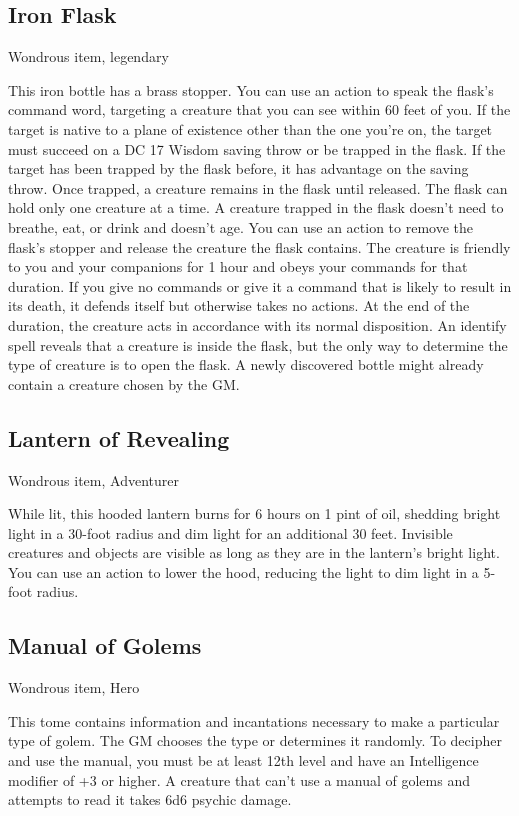 \subsection{Iron Flask}
Wondrous item, legendary 

This iron bottle has a brass stopper. You can use an action to speak the flask's command word, targeting a creature that you can see within 60 feet of you. If the target is native to a plane of existence other than the one you're on, the target must succeed on a DC 17 Wisdom saving throw or be trapped in the flask. If the target has been trapped by the flask before, it has advantage on the saving throw. Once trapped, a creature remains in the flask until released. The flask can hold only one creature at a time. A creature trapped in the flask doesn't need to breathe, eat, or drink and doesn't age.  You can use an action to remove the flask's stopper and release the creature the flask contains. The creature is friendly to you and your companions for 1 hour and obeys your commands for that duration. If you give no commands or give it a command that is likely to result in its death, it defends itself but otherwise takes no actions. At the end of the duration, the creature acts in accordance with its normal disposition. An identify spell reveals that a creature is inside the flask, but the only way to determine the type of creature is to open the flask. A newly discovered bottle might already contain a creature chosen by the GM.

\subsection{Lantern of Revealing}
Wondrous item, Adventurer

While lit, this hooded lantern burns for 6 hours on 1 pint of oil, shedding bright light in a 30-foot radius and dim light for an additional 30 feet. Invisible creatures and objects are visible as long as they are in the lantern's bright light. You can use an action to lower the hood, reducing the light to dim light in a 5-foot radius.

\subsection{Manual of Golems}
Wondrous item, Hero

This tome contains information and incantations necessary to make a particular type of golem. The GM chooses the type or determines it randomly. To decipher and use the manual, you must be at least 12th level and have an Intelligence modifier of +3 or higher. A creature that can't use a manual of golems and attempts to read it takes 6d6 psychic damage.

